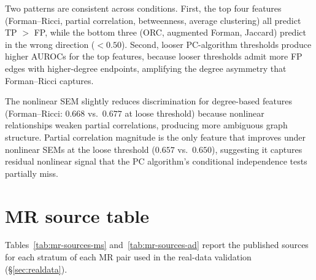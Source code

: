\documentclass{article}
\begin{document}
Two patterns are consistent across conditions. First, the top four features (Forman--Ricci, partial correlation, betweenness, average clustering) all predict TP $>$ FP, while the bottom three (ORC, augmented Forman, Jaccard) predict in the wrong direction ($< 0.50$). Second, looser PC-algorithm thresholds produce higher AUROCs for the top features, because looser thresholds admit more FP edges with higher-degree endpoints, amplifying the degree asymmetry that Forman--Ricci captures.

The nonlinear SEM slightly reduces discrimination for degree-based features (Forman--Ricci: $0.668$ vs.\ $0.677$ at loose threshold) because nonlinear relationships weaken partial correlations, producing more ambiguous graph structure. Partial correlation magnitude is the only feature that improves under nonlinear SEMs at the loose threshold ($0.657$ vs.\ $0.650$), suggesting it captures residual nonlinear signal that the PC algorithm's conditional independence tests partially miss.

\section{MR source table}
\label{app:mr-sources}

Tables~\ref{tab:mr-sources-ms} and~\ref{tab:mr-sources-ad} report the published sources for each stratum of each MR pair used in the real-data validation (\S\ref{sec:realdata}).
\end{document}
